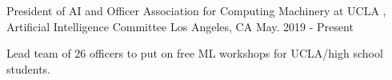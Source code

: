 \cventry
    {President of AI and Officer} %
    {Association for Computing Machinery at UCLA , Artificial Intelligence Committee} %
    {Los Angeles, CA} %
    {May. 2019 - Present} %
    {
    \begin{cvitems} %
        \item {Lead team of 26 officers to put on free ML workshops for UCLA/high school students.}
    \end{cvitems}
    }